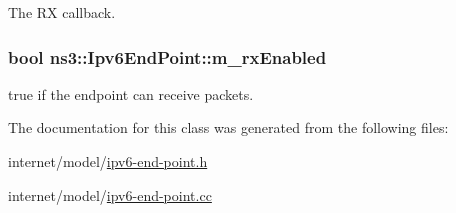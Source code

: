 The RX callback. 

\subsubsection[{\texorpdfstring{m\+\_\+rx\+Enabled}{m_rxEnabled}}]{\setlength{\rightskip}{0pt plus 5cm}bool ns3\+::\+Ipv6\+End\+Point\+::m\+\_\+rx\+Enabled\hspace{0.3cm}{\ttfamily [private]}}\hypertarget{classns3_1_1Ipv6EndPoint_a63d3381b11d213f97bf47c935eeb4cd7}{}\label{classns3_1_1Ipv6EndPoint_a63d3381b11d213f97bf47c935eeb4cd7}


true if the endpoint can receive packets. 



The documentation for this class was generated from the following files\+:\begin{DoxyCompactItemize}
\item 
internet/model/\hyperlink{ipv6-end-point_8h}{ipv6-\/end-\/point.\+h}\item 
internet/model/\hyperlink{ipv6-end-point_8cc}{ipv6-\/end-\/point.\+cc}\end{DoxyCompactItemize}
